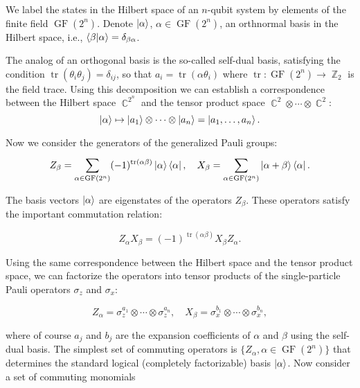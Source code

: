 \documentclass[a4paper,11pt]{report}
\DeclareMathOperator{\C}{\mathbb{C}}
\DeclareMathOperator{\Z}{\mathbb{Z}}
\DeclareMathOperator{\tr}{tr}
\DeclareMathOperator{\GF}{GF}
\begin{document}
    We label the states in the Hilbert space of an $n$-qubit
    system by elements of the finite field $\GF(2^{n})$.
    Denote $\ket \alpha$, $\alpha \in \GF(2^{n})$, an
    orthnormal basis in the Hilbert space, i.e.,
    $\braket{\beta|\alpha} = \delta_{\beta\alpha}$.

    The analog of an orthogonal basis is the so-called
    self-dual basis, satisfying the condition $\tr(\theta_i
    \theta_j) = \delta_{ij}$, so that $a_i = \tr(\alpha
    \theta_i)$ where $\tr : \GF(2^{n}) \to \Z_2$ is the
    field trace. Using this decomposition we can establish a
    correspondence between the Hilbert space $\C^{2^{n}}$ 
    and the tensor product space $\C^2 \otimes \cdots
    \otimes \C^2$:
    \begin{equation}
        \ket \alpha
        \mapsto \ket{a_1} \otimes \cdots \otimes \ket{a_n}
        = \ket{a_1,\ldots,a_n}.
    \end{equation}

    Now we consider the generators of the generalized Pauli
    groups:
    \begin{equation}
        Z_{\beta}
        = \sum_{\alpha \in \GF(2^{n})}^{}
        (-1)^{\tr(\alpha\beta)} \ket \alpha \bra \alpha,
        \quad
        X_{\beta}
        = \sum_{\alpha \in \GF(2^{n})}^{} 
        \ket{\alpha + \beta} \bra{\alpha}.
    \end{equation}
    
    The basis vectors $\ket \alpha$ are eigenstates of the
    operators $Z_\beta$. These operators satisfy the
    important commutation relation:
    
    \begin{equation}
        Z_\alpha X_\beta
        = (-1)^{\tr(\alpha\beta)} X_\beta Z_\alpha.
    \end{equation}
    
    Using the same correspondence between the Hilbert space
    and the tensor product space, we can factorize the
    operators into tensor products of the single-particle
    Pauli operators $\sigma_z$ and $\sigma_x$:

    \begin{equation}
        Z_\alpha
        = \sigma_{z}^{a_1} \otimes \cdots \otimes
        \sigma_z^{a_n},
        \quad
        X_\beta
        = \sigma_x^{b_1} \otimes \cdots \otimes
        \sigma_x^{b_n},
    \end{equation}
    
    where of course $a_j$ and $b_j$ are the expansion
    coefficients of $\alpha$ and $\beta$ using the self-dual
    basis. The simplest set of commuting operators is
    $\{Z_\alpha, \alpha \in \GF(2^{n})\}$ that determines
    the standard logical (completely factorizable) basis
    $\ket \alpha$. Now consider a set of commuting
    monomials
\end{document}
